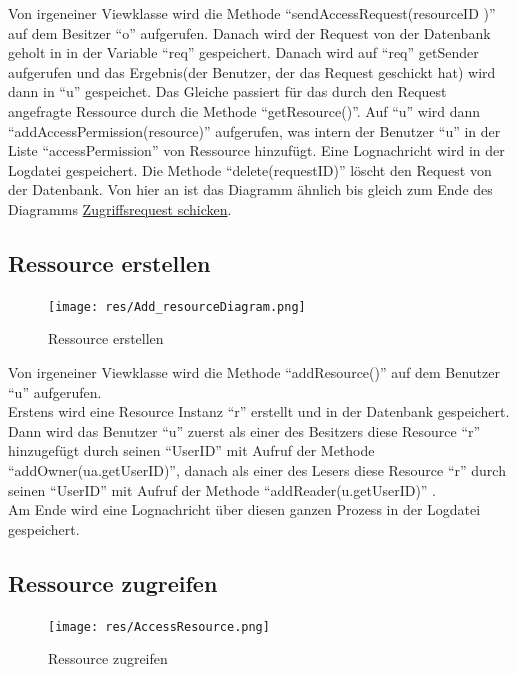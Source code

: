 \documentclass[parskip=full,11pt]{scrartcl}
\begin{document}
 Von irgeneiner Viewklasse wird die Methode \enquote{sendAccessRequest(resourceID )} auf dem Besitzer \enquote{o}  aufgerufen. Danach wird der Request von der Datenbank geholt in in der Variable \enquote{req} gespeichert. Danach wird auf \enquote{req} getSender aufgerufen und das Ergebnis(der Benutzer, der das Request geschickt hat) wird dann in \enquote{u} gespeichet. Das Gleiche passiert für das durch den Request angefragte Ressource durch die Methode \enquote{getResource()}. Auf \enquote{u} wird dann \enquote{addAccessPermission(resource)} aufgerufen, was intern der Benutzer \enquote{u} in der Liste \enquote{accessPermission} von Ressource hinzufügt. Eine Lognachricht wird in der Logdatei gespeichert. Die Methode \enquote{delete(requestID)} löscht den Request von der Datenbank. Von hier an ist das Diagramm ähnlich bis gleich zum Ende des Diagramms \hyperref[fig:sendAccReq]{Zugriffsrequest schicken}. 
 
  \newpage
 \subsection{Ressource erstellen}
 \begin{figure}[ht!]
 	\centering
 	\texttt{[image: res/Add\_resourceDiagram.png]}
 	\caption{Ressource erstellen}
 \end{figure}
 
Von irgeneiner Viewklasse wird die Methode \enquote{addResource()} auf dem Benutzer \enquote{u}  aufgerufen.\\ Erstens wird eine Resource Instanz \enquote{r} erstellt und in der Datenbank gespeichert.\\ Dann wird das Benutzer \enquote{u} zuerst als einer des Besitzers diese Resource \enquote{r} hinzugefügt durch seinen \enquote{UserID} mit Aufruf der Methode \enquote{addOwner(ua.getUserID)}, danach als einer des Lesers diese Resource \enquote{r} durch seinen \enquote{UserID} mit Aufruf der Methode \enquote{addReader(u.getUserID)} .\\Am Ende wird eine Lognachricht über diesen ganzen Prozess in der Logdatei gespeichert.

    \newpage
 \subsection{Ressource zugreifen}
 \begin{figure}[ht!]
 	\centering
 	\texttt{[image: res/AccessResource.png]}
 	\caption{Ressource zugreifen}
 \end{figure}
 \newpage
 
\end{document}
